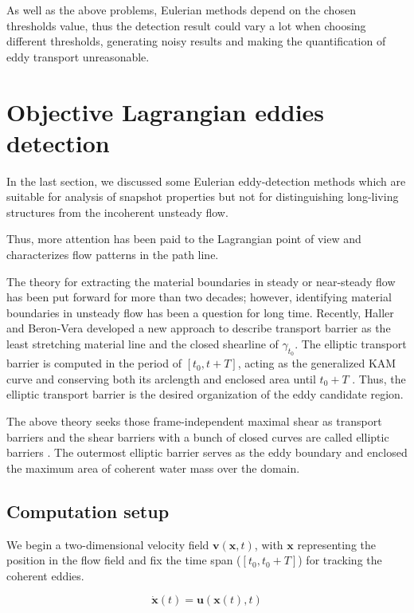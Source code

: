 As well as the above problems, Eulerian methods depend on the chosen thresholds value, thus the detection result could vary a lot when choosing different thresholds, generating noisy results and making the quantification of eddy transport unreasonable. 

\section{Objective Lagrangian eddies detection}\label{Lagrangian eddies detection}

In the last section, we discussed some Eulerian eddy-detection methods which are suitable for analysis of snapshot properties but not for distinguishing long-living structures from the incoherent unsteady flow.

Thus, more attention has been paid to the Lagrangian point of view and characterizes flow patterns in the path line.

The theory for extracting the material boundaries in steady or near-steady flow has been put forward for more than two decades; however, identifying material boundaries in unsteady flow has been a question for long time. Recently, Haller and Beron-Vera developed a new approach to describe transport barrier as the least stretching material line and the closed shearline of $\gamma_{t_0}$. The elliptic transport barrier is computed in the period of $[t_0,t+T]$, acting as the generalized KAM curve and conserving both its arclength and enclosed area until $t_0+T$ \cite{haller2012geodesic}. Thus, the elliptic transport barrier is the desired organization of the eddy candidate region.

The above theory seeks those frame-independent maximal shear as transport barriers and the shear barriers with a bunch of closed curves are called elliptic barriers \cite{wang2015identification}. The outermost elliptic barrier serves as the eddy boundary and enclosed the maximum area of coherent water mass over the domain\cite{wang2015identification}. 

\subsection{Computation setup}

We begin a two-dimensional velocity field $ \mathbf{v}(\mathbf{x},t)$, with $\mathbf{x}$ representing the position in the flow field and fix the time span ($[t_0,t_0+T]$) for tracking the coherent eddies.


\begin{equation}
    \dot{\mathbf{x}}(t)=\mathbf{u}(\mathbf{x}(t), t)
\end{equation}


